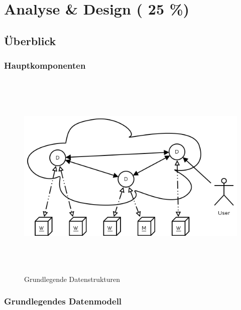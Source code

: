 \chapter{Analyse \& Design ( 25 \%)}






\section{\"Uberblick}
\subsection{Hauptkomponenten}


\begin{figure}[ht] 
  \label{fig:grob-layout-komponenten}
  \begin{center}
      \includegraphics[height=4in]{imageinput/grob-layout-komponenten.png}
  \end{center}
  \caption{Grundlegende Datenstrukturen}
\end{figure}




\subsection{Grundlegendes Datenmodell}


